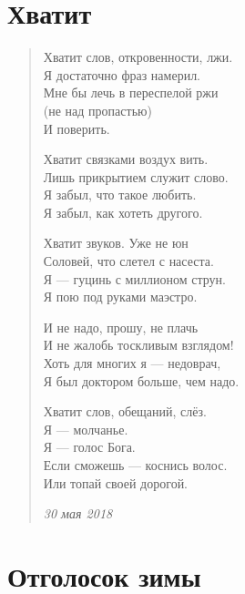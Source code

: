 \section{Хватит}

\begin{verse}
Хватит слов, откровенности, лжи.\\
Я достаточно фраз намерил.\\
Мне бы лечь в переспелой ржи\\
(не над пропастью)\\
И поверить.

Хватит связками воздух вить.\\
Лишь прикрытием служит слово.\\
Я забыл, что такое любить.\\
Я забыл, как хотеть другого.

Хватит звуков. Уже не юн\\
Соловей, что слетел с насеста.\\
Я --- гуцинь с миллионом струн.\\
Я пою под руками маэстро.

И не надо, прошу, не плачь\\
И не жалобь тоскливым взглядом!\\
Хоть для многих я --- недоврач,\\
Я был доктором больше, чем надо.

Хватит слов, обещаний, слёз.\\
Я --- молчанье.\\
Я --- голос Бога.\\
Если сможешь --- коснись волос.\\
Или топай своей дорогой.

\emph{30 мая 2018}
\end{verse}
\newpage

\section{Отголосок зимы}

